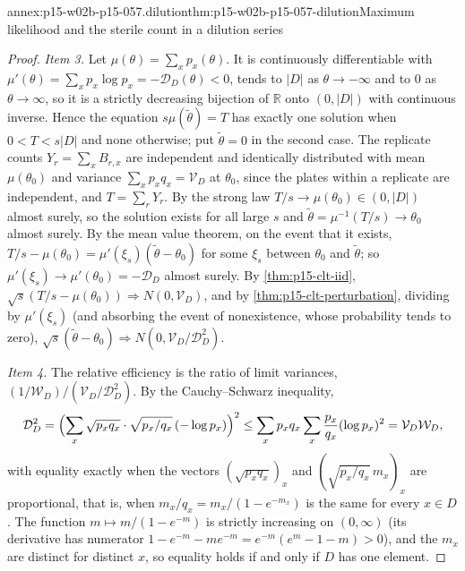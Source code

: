 \begin{annexitem}{annex:p15-w02b-p15-057.dilution}{thm:p15-w02b-p15-057-dilution}{Maximum likelihood and the sterile count in a dilution series}
\begin{proof}
\emph{Item 3.} Let \(\mu(\theta)=\sum_xp_x(\theta)\). It is continuously
differentiable with \(\mu'(\theta)=\sum_xp_x\log p_x=-\mathcal
D_D(\theta)<0\), tends to \(|D|\) as \(\theta\to-\infty\) and to \(0\) as
\(\theta\to\infty\), so it is a strictly decreasing bijection of
\(\mathbb R\) onto \((0,|D|)\) with continuous inverse. Hence the equation
\(s\mu(\widetilde\theta)=T\) has exactly one solution when \(0<T<s|D|\)
and none otherwise; put \(\widetilde\theta=0\) in the second case. The
replicate counts \(Y_r=\sum_xB_{r,x}\) are independent and identically
distributed with mean \(\mu(\theta_0)\) and variance
\(\sum_xp_xq_x=\mathcal V_D\) at \(\theta_0\), since the plates within a
replicate are independent, and \(T=\sum_rY_r\). By the strong law
\(T/s\to\mu(\theta_0)\in(0,|D|)\) almost surely, so the solution exists for
all large \(s\) and \(\widetilde\theta=\mu^{-1}(T/s)\to\theta_0\) almost
surely. By the mean value theorem, on the event that it exists,
\(T/s-\mu(\theta_0)=\mu'(\xi_s)(\widetilde\theta-\theta_0)\) for some
\(\xi_s\) between \(\theta_0\) and \(\widetilde\theta\); so
\(\mu'(\xi_s)\to\mu'(\theta_0)=-\mathcal D_D\) almost surely. By
\cref{thm:p15-clt-iid}, \(\sqrt s(T/s-\mu(\theta_0))\Rightarrow
N(0,\mathcal V_D)\), and by \cref{thm:p15-clt-perturbation}, dividing by
\(\mu'(\xi_s)\) (and absorbing the event of nonexistence, whose
probability tends to zero),
\(\sqrt s(\widetilde\theta-\theta_0)\Rightarrow
N(0,\mathcal V_D/\mathcal D_D^2)\).

\emph{Item 4.} The relative efficiency is the ratio of limit variances,
\((1/\mathcal W_D)/(\mathcal V_D/\mathcal D_D^2)\). By the Cauchy--Schwarz
inequality,
\[
 \mathcal D_D^2=\Bigl(\sum_x\sqrt{p_xq_x}\cdot\sqrt{p_x/q_x}\,
 (-\log p_x)\Bigr)^2\leq\sum_xp_xq_x\sum_x\frac{p_x}{q_x}(\log p_x)^2
 =\mathcal V_D\mathcal W_D,
\]
with equality exactly when the vectors \((\sqrt{p_xq_x})_x\) and
\((\sqrt{p_x/q_x}\,m_x)_x\) are proportional, that is, when
\(m_x/q_x=m_x/(1-e^{-m_x})\) is the same for every \(x\in D\). The function
\(m\mapsto m/(1-e^{-m})\) is strictly increasing on \((0,\infty)\) (its
derivative has numerator \(1-e^{-m}-me^{-m}=e^{-m}(e^m-1-m)>0\)), and the
\(m_x\) are distinct for distinct \(x\), so equality holds if and only if
\(D\) has one element.
\end{proof}
\end{annexitem}

